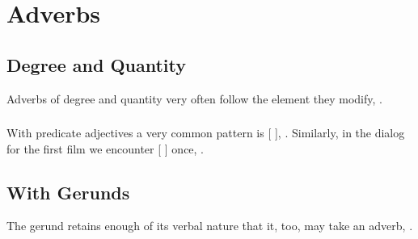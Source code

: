 %
%

\section{Adverbs}

\subsection{Degree and Quantity} Adverbs of degree and quantity very
often follow the element they modify,  .

\subsubsection{} With predicate adjectives a very common pattern is
[  ],  .
Similarly, in the dialog for the first film we encounter
[  ] once,  .

\subsection{With Gerunds} The gerund retains enough of its verbal
nature that it, too, may take an adverb,  .  \label{syn:adverbs:gerund}

